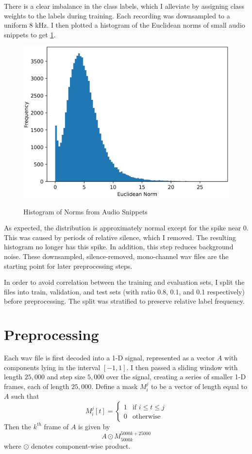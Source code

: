 \documentclass[11pt,a4paper]{article}
\begin{document}
There is a clear imbalance in the class labels, which I alleviate by assigning class weights to the labels during training. Each recording was downsampled to a uniform 8 kHz. I then plotted a histogram of the Euclidean norms of small audio snippets to get \cref{fig:norms}.
\begin{figure}[h]
  \centering
  \caption{Histogram of Norms from Audio Snippets}
  \includegraphics[width=.48\textwidth]{norms.png}
  \label{fig:norms}
\end{figure}

As expected, the distribution is approximately normal except for the spike near 0. This was caused by periods of relative silence, which I removed. The resulting histogram no longer has this spike. In addition, this step reduces background noise. These downsampled, silence-removed, mono-channel wav files are the starting point for later preprocessing steps.

In order to avoid correlation between the training and evaluation sets, I split the files into train, validation, and test sets (with ratio 0.8, 0.1, and 0.1 respectively) before preprocessing. The split was stratified to preserve relative label frequency.

\section{Preprocessing} \label{sec:preprocessing}

Each wav file is first decoded into a 1-D signal, represented as a vector \(A\) with components lying in the interval \([-1, 1]\). I then passed a sliding window with length \(25,000\) and step size \(5,000\) over the signal, creating a series of smaller 1-D frames, each of length \(25,000\). Define a mask \(M_i^j\) to be a vector of length equal to \(A\) such that
\begin{equation}
  M_i^j[t] = \begin{cases}
    1 & \text{if } i \leq t \leq j \\
    0 & \text{otherwise}
  \end{cases}
\end{equation}
Then the \(k^{th}\) frame of \(A\) is given by
\begin{equation}
  A \odot M_{5000k}^{5000k + 25000}
\end{equation}
where \(\odot\) denotes component-wise product.
\end{document}
